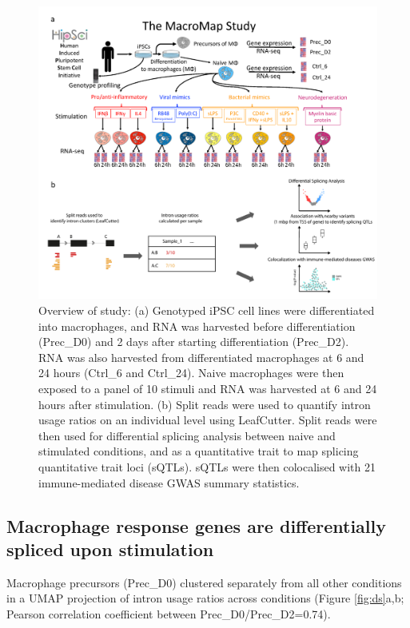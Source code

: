 \begin{figure}
  \centering
  \includegraphics[width=\textwidth]{study_desc}
  \caption{Overview of study: (a) Genotyped iPSC cell lines were differentiated into macrophages, and RNA was harvested before differentiation (Prec\_D0) and 2 days after starting differentiation (Prec\_D2). RNA was also harvested from differentiated macrophages at 6 and 24 hours (Ctrl\_6 and Ctrl\_24). Naive macrophages were then exposed to a panel of 10 stimuli and RNA was harvested at 6 and 24 hours after stimulation. (b) Split reads were used to quantify intron usage ratios on an individual level using LeafCutter. Split reads were then used for differential splicing analysis between naive and stimulated conditions, and as a quantitative trait to map splicing quantitative trait loci (sQTLs). sQTLs were then colocalised with 21 immune-mediated disease GWAS summary statistics.}
  \label{fig:study_desc}   
\end{figure}

\subsection{Macrophage response genes are differentially spliced upon stimulation}

Macrophage precursors (Prec\_D0) clustered separately from all other conditions in a UMAP projection of intron usage ratios across conditions (Figure \ref{fig:ds}a,b; Pearson correlation coefficient between Prec\_D0/Prec\_D2=0.74). \\

